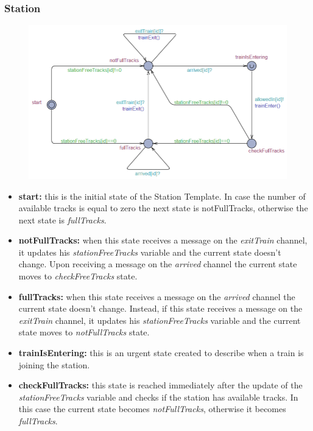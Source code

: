 \subsubsection{Station}
\begin{figure}[H]
    \centering
    \includegraphics[scale=0.9]{images/stationTemplate.png}
\end{figure}

\begin{itemize}
    \item \textbf{start: }this is the initial state of the Station Template. In case the number of available
            tracks is equal to zero the next state is notFullTracks, otherwise the next state is \emph{fullTracks}.
    \item \textbf{notFullTracks: }when this state receives a message on the \emph{exitTrain} channel, it updates his 
            \emph{stationFreeTracks} variable and the current state doesn't change. Upon receiving a message on the 
            \emph{arrived} channel the current state moves to \emph{checkFreeTracks} state.
    \item \textbf{fullTracks: }when this state receives a message on the \emph{arrived} channel the current state doesn't change. 
            Instead, if this state receives a message on the \emph{exitTrain} channel, it updates his \emph{stationFreeTracks} 
            variable and the current state moves to \emph{notFullTracks} state.
    \item \textbf{trainIsEntering: }this is an urgent state created to describe when a train is joining the station.
    \item \textbf{checkFullTracks: }this state is reached immediately after the update of the \emph{stationFreeTracks} variable
            and checks if the station has available tracks. In this case the current state becomes \emph{notFullTracks},
            otherwise it becomes \emph{fullTracks}.
\end{itemize}
\newpage

